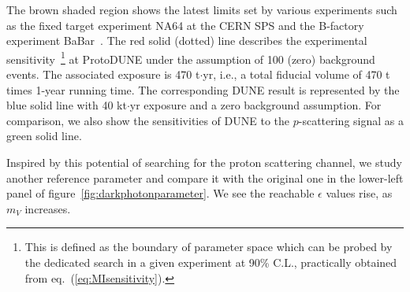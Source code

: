 The brown shaded region shows the latest limits set by various experiments such as the fixed target experiment NA64 at the CERN SPS and the B-factory experiment BaBar~\cite{Banerjee:2017hhz}.
The red solid (dotted) line describes the experimental sensitivity~\footnote{This is defined as the boundary of parameter space which can be probed by the dedicated search in a given experiment at 90\% C.L., practically obtained from eq.~(\ref{eq:MIsensitivity}).} at ProtoDUNE under the assumption of 100 (zero) background events. 
The associated exposure is 470 t$\cdot$yr, i.e., a total fiducial volume of 470 t times 1-year running time. 
The corresponding DUNE result is represented by the blue solid line with 40 kt$\cdot$yr exposure and a zero background assumption. 
For comparison, we also show the sensitivities of DUNE to the $p$-scattering signal as a green solid line. 

Inspired by this potential of searching for the proton scattering channel, we study another reference parameter and compare it with the original one in the lower-left panel of figure~\ref{fig:darkphotonparameter}. 
We see the reachable $\epsilon$ values rise, as $m_V$ increases. 

